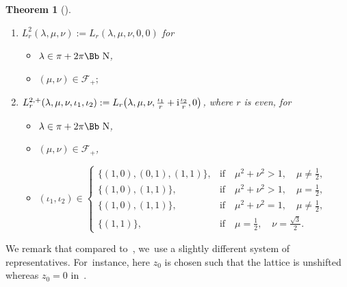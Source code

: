 \documentclass[pdftex]{sigma}
\newcommand\NN{{\mbox{\Bb N}}}
\newcommand\ZZ{{\mbox{\Bb Z}}}
\newcommand\SSS{{\mbox{\Bb S}}}
\newcommand\cF{{\mathcal F}}
\numberwithin{equation}{section}
\newtheorem{Theorem}{Theorem}[section]
\begin{document}
\begin{Theorem}[\cite{F}]
\begin{enumerate}
\begin{itemize}
\begin{gather*}
\begin{cases}
\\
\big\langle \left(\begin{smallmatrix}1&-1\\0&-1\end{smallmatrix}\right),\left(\begin{smallmatrix}1&-1\\1&0\end{smallmatrix}\right)\big\rangle\simeq D_6, & \text{if}\quad \mu=\frac{1}{2},\quad \nu=\frac{\sqrt{3}}{2},
\end{cases}
\end{gather*}
and $S\in\SSS$ acts on~$\iota\in\ZZ^2_r$
by
$S\cdot\iota=\det(S)S(\iota);$
\end{itemize}
%
\item[$2.$] $L^2_r(\lambda,\mu,\nu):=L_r(\lambda,\mu,\nu,0,0)$ for
\begin{itemize}
\item[$\circ$] $\lambda\in\pi+2\pi\NN$,
\item[$\circ$] $(\mu,\nu)\in\cF_+;$
\end{itemize}
%
\item[$3.$] $L^{2,+}_r(\lambda,\mu,\nu,\iota_1,\iota_2):= L_r\big(\lambda,\mu,\nu,\frac{\iota_1}{r}+{\rm i}\frac{\iota_2}{r},0\big)$, where $r$ is even, for
\begin{itemize}
\item[$\circ$] $\lambda\in\pi+2\pi\NN$,
\item[$\circ$] $(\mu,\nu)\in\cF_+$,
\item[$\circ$]
$(\iota_1,\iota_2)\in
\begin{cases}	
\{(1,0),(0,1),(1,1)\}, &\text{if}\quad
\mu^2+\nu^2>1,\quad \mu\neq\frac{1}{2 },
\\[0.5ex]
\{(1,0),(1,1)\}, &\text{if}\quad \mu^2+\nu^2>1,\quad \mu=\frac{1}{2},
\\[0.5ex]
\{(1,0),(1,1)\}, &\text{if}\quad \mu^2+\nu^2=1,\quad \mu\neq\frac{1}{2},\\%
\{(1,1)\} ,&\text{if}\quad \mu=\frac{1}{2},\quad \nu=\frac{\sqrt{3}}{2}.
\end{cases}$
\end{itemize}
\end{enumerate}
\end{Theorem}
We remark that compared to~\cite{F}, we~use a slightly different system of representatives. For~instance, here $z_0$ is chosen such that the lattice is unshifted whereas $z_0=0$ in~\cite{F}.
\end{document}
